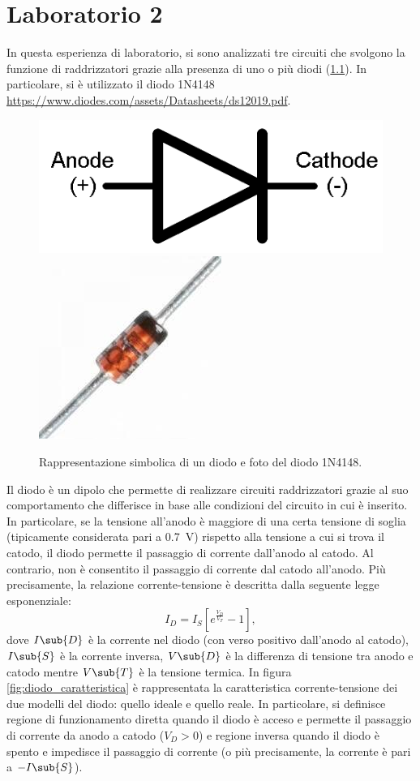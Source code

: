 \chapter{Laboratorio 2}
In questa esperienza di laboratorio, si sono analizzati tre circuiti che svolgono la funzione di raddrizzatori grazie alla presenza di uno o più diodi (\Fig\ref{fig:diodo}). In particolare, si è utilizzato il diodo 1N4148 \url{https://www.diodes.com/assets/Datasheets/ds12019.pdf}.
\begin{figure}[h]
	\centering
	\includegraphics[width=0.3\linewidth]{./ImageFiles/Laboratorio 2/diodo_1}
	\includegraphics[width=0.2\linewidth]{./ImageFiles/Laboratorio 2/diodo_4}
	\caption{Rappresentazione simbolica di un diodo e foto del diodo 1N4148.}
	\label{fig:diodo}
\end{figure}
Il diodo è un dipolo che permette di realizzare circuiti raddrizzatori grazie al suo comportamento che differisce in base alle condizioni del circuito in cui è inserito. In particolare, se la tensione all'anodo è maggiore di una certa tensione di soglia (tipicamente considerata pari a \SI{0.7}{\volt}) rispetto alla tensione a cui si trova il catodo, il diodo permette il passaggio di corrente dall'anodo al catodo. Al contrario, non è consentito il passaggio di corrente dal catodo all'anodo. Più precisamente, la relazione corrente-tensione è descritta dalla seguente legge esponenziale:
\begin{equation}
	I_D=I_S[e^{\frac{V_D}{V_T}}-1],
\end{equation}
dove $I\sub{D}$ è la corrente nel diodo (con verso positivo dall'anodo al catodo), $I\sub{S}$ è la corrente inversa, $V\sub{D}$ è la differenza di tensione tra anodo e catodo mentre $V\sub{T}$ è la tensione termica. In figura \ref{fig:diodo_caratteristica} è rappresentata la caratteristica corrente-tensione dei due modelli del diodo: quello ideale e quello reale. In particolare, si definisce regione di funzionamento diretta quando il diodo è acceso e permette il passaggio di corrente da anodo a catodo ($V_{D}>0$) e regione inversa quando il diodo è spento e impedisce il passaggio di corrente (o più precisamente, la corrente è pari a $-I\sub{S}$).
